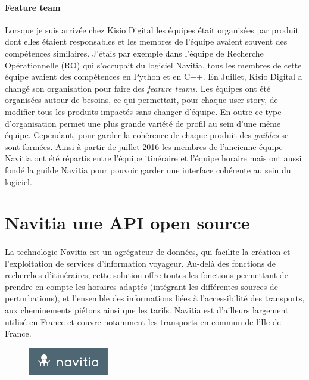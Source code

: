\documentclass[a4paper]{report}
\begin{document}
\paragraph {Feature team} Lorsque je suis arrivée chez Kisio Digital les équipes était organisées par produit dont elles étaient responsables et les membres de l'équipe avaient souvent des compétences similaires. J'étais par exemple dans l'équipe de Recherche Opérationnelle (RO) qui s'occupait du logiciel Navitia, tous les membres de cette équipe avaient des compétences en Python et en C++. En Juillet, Kisio Digital a changé son organisation pour faire des \emph{feature teams}. Les équipes ont été organisées autour de besoins, ce qui permettait, pour chaque user story, de modifier tous les produits impactés sans changer d'équipe. En outre ce type d'organisation permet une plus grande variété de profil au sein d'une même équipe. Cependant, pour garder la cohérence de chaque produit des \emph{guildes} se sont formées. Ainsi à partir de juillet 2016 les membres de l'ancienne équipe Navitia ont été répartis entre l'équipe itinéraire et l'équipe horaire mais ont aussi fondé la guilde Navitia pour pouvoir garder une interface cohérente au sein du logiciel.

\section{Navitia une API open source}

\paragraph{}La technologie Navitia est un agrégateur de données, qui facilite la création et l’exploitation de services d’information voyageur. Au-delà des fonctions de recherches d’itinéraires, cette solution offre toutes les fonctions permettant de prendre en compte les horaires adaptés (intégrant les différentes sources de perturbations), et l’ensemble des informations liées à l’accessibilité des transports, aux cheminements piétons ainsi que les tarifs. Navitia est d’ailleurs largement utilisé en France et couvre notamment les transports en commun de l’Ile de France.  

\begin{figure}[H] 
	\begin{center}
		\includegraphics[width=100pt]{image/logo_navitia}
	\end{center}
\end{figure}
\end{document}
